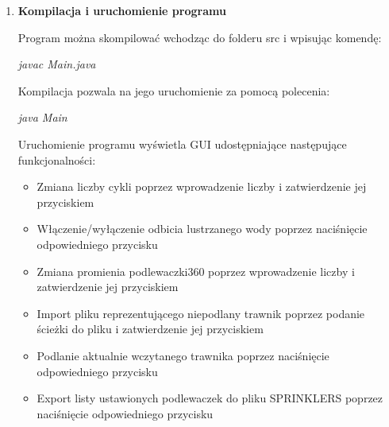 \documentclass[12pt]{article}
\renewcommand{\_}{\kern-1.5pt\textunderscore\kern-1.5pt}
\begin{document}
\begin{enumerate}
\vspace{\baselineskip}

\vspace{\baselineskip}

\vspace{\baselineskip}
	\item \textbf{Kompilacja i uruchomienie programu}\par

Program można skompilować wchodząc do folderu src i wpisując komendę:\par

\begin{Center}
\textit{javac Main.java}
\end{Center}\par

Kompilacja pozwala na jego uruchomienie za pomocą polecenia:\par

\begin{Center}
\textit{java Main}
\end{Center}\par

Uruchomienie programu wyświetla GUI udostępniające następujące funkcjonalności:\par

\begin{itemize}
	\item Zmiana liczby cykli poprzez wprowadzenie liczby i zatwierdzenie jej przyciskiem\par

	\item Włączenie/wyłączenie odbicia lustrzanego wody poprzez naciśnięcie odpowiedniego przycisku\par

	\item Zmiana promienia podlewaczki360 poprzez wprowadzenie liczby i zatwierdzenie jej przyciskiem\par

	\item Import pliku reprezentującego niepodlany trawnik poprzez podanie ścieżki do pliku i zatwierdzenie jej przyciskiem\par

	\item Podlanie aktualnie wczytanego trawnika poprzez naciśnięcie odpowiedniego przycisku\par

	\item Export listy ustawionych podlewaczek do pliku SPRINKLERS poprzez naciśnięcie odpowiedniego przycisku\par


\end{itemize}
\end{enumerate}
\end{document}
